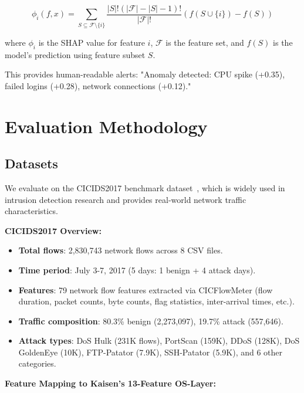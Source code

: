 \documentclass[conference]{IEEEtran}
\begin{document}
\begin{equation}
\phi_i(f, x) = \sum_{S \subseteq \mathcal{F} \setminus \{i\}} \frac{|S|! (|\mathcal{F}| - |S| - 1)!}{|\mathcal{F}|!} (f(S \cup \{i\}) - f(S))
\end{equation}

where $\phi_i$ is the SHAP value for feature $i$, $\mathcal{F}$ is the feature set, and $f(S)$ is the model's prediction using feature subset $S$.

This provides human-readable alerts: "Anomaly detected: CPU spike (+0.35), failed logins (+0.28), network connections (+0.12)."

\section{Evaluation Methodology}\label{sec:eval}

\subsection{Datasets}

We evaluate on the CICIDS2017 benchmark dataset~\cite{sharafaldin2018toward}, which is widely used in intrusion detection research and provides real-world network traffic characteristics.

\textbf{CICIDS2017 Overview:}
\begin{itemize}
\item \textbf{Total flows}: 2,830,743 network flows across 8 CSV files.
\item \textbf{Time period}: July 3-7, 2017 (5 days: 1 benign + 4 attack days).
\item \textbf{Features}: 79 network flow features extracted via CICFlowMeter (flow duration, packet counts, byte counts, flag statistics, inter-arrival times, etc.).
\item \textbf{Traffic composition}: 80.3\% benign (2,273,097), 19.7\% attack (557,646).
\item \textbf{Attack types}: DoS Hulk (231K flows), PortScan (159K), DDoS (128K), DoS GoldenEye (10K), FTP-Patator (7.9K), SSH-Patator (5.9K), and 6 other categories.
\end{itemize}

\textbf{Feature Mapping to Kaisen's 13-Feature OS-Layer:}
\end{document}
